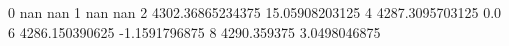 0 nan nan
1 nan nan
2 4302.36865234375 15.05908203125
4 4287.3095703125 0.0
6 4286.150390625 -1.1591796875
8 4290.359375 3.0498046875
